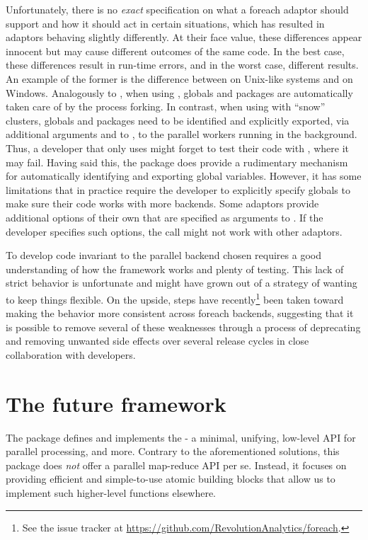 Unfortunately, there is no \emph{exact} specification on what a
foreach adaptor should support and how it should act in certain
situations, which has resulted in adaptors behaving slightly
differently. At their face value, these differences appear innocent
but may cause different outcomes of the same code. In the best case,
these differences result in run-time errors, and in the worst case,
different results. An example of the former is the difference
between  on Unix-like systems and  on
Windows. Analogously to , when using ,
globals and packages are automatically taken care of by the process
forking. In contrast, when using  with ``snow''
clusters, globals and packages need to be identified and explicitly
exported, via additional arguments  and 
to , to the parallel workers running in the
background.  Thus, a developer that only uses  might forget
to test their code with , where it may fail.  Having
said this, the  package does provide a rudimentary
mechanism for automatically identifying and exporting global
variables.  However, it has some limitations that in practice require
the developer to explicitly specify globals to make sure their code
works with more backends.  Some adaptors provide additional options of
their own that are specified as arguments to . If the
developer specifies such options, the  call might not
work with other adaptors.

To develop  code invariant to the parallel backend
chosen requires a good understanding of how the 
framework works and plenty of testing. This lack of strict behavior is
unfortunate and might have grown out of a strategy of wanting to keep
things flexible. On the upside, steps have recently\footnote{See
the  issue tracker
at \url{https://github.com/RevolutionAnalytics/foreach}.}
been taken toward making the behavior more consistent across foreach
backends, suggesting that it is possible to remove several of these
weaknesses through a process of deprecating and removing unwanted side
effects over several release cycles in close collaboration with
developers.


\section{The future framework}

The  package defines and implements the  -
a minimal, unifying, low-level API for parallel processing, and more.
Contrary to the aforementioned solutions, this package does \emph{not}
offer a parallel map-reduce API per se.  Instead, it focuses on
providing efficient and simple-to-use atomic building blocks that
allow us to implement such higher-level functions elsewhere.


